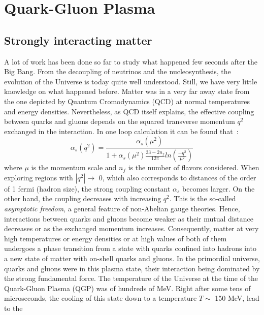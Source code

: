 
\chapter{Quark-Gluon Plasma} %

\label{Chapter1} %

\section{Strongly interacting matter}
A lot of work has been done so far to study what happened few seconds
after the Big Bang. From the decoupling of neutrinos 
and the nucleosynthesis, the evolution of the Universe is today quite well
understood. Still, we have very little knowledge on what happened before.
Matter was in a very far away state from the one depicted by Quantum Cromodynamics (QCD) at normal temperatures and energy densities. 
Nevertheless, as QCD itself explains, the effective coupling between quarks and gluons depends on the squared transverse momentum $q^2$ exchanged in the interaction. In one loop calculation it can be found that~\cite{Wilson:1970ag}:
\begin{equation}
\alpha_s(q^2)=\frac{\alpha_s (\mu^2)}{1+\alpha_s (\mu^2) \frac{33-2n_f}{12\pi}ln(\frac{-q^2}{\mu^2})}
\end{equation}
where $\mu$ is the momentum scale and $n_f$ is the number of flavors considered. When exploring regions with $|q^2|\rightarrow$ 0, which also corresponds to distances of the order of 1 fermi (hadron size), the strong coupling constant $\alpha_s$ becomes larger. On the other hand, the coupling decreases with increasing $q^2$. This is the so-called {\it asymptotic freedom}, a general feature of non-Abelian gauge theories. Hence, interactions between quarks and gluons become weaker as their mutual distance decreases or as the exchanged momentum increases.
Consequently, matter at very high temperatures or energy densities or at high values of both of them undergoes a phase transition from a state with quarks confined into hadrons into a new state of matter with on-shell quarks and gluons. 
In the primordial universe, quarks and gluons were in this plasma state, their interaction being dominated by the strong fundamental force.
The temperature of the Universe at the time of the Quark-Gluon Plasma (QGP) 
was of hundreds of MeV.
Right after some tens of microseconds, the cooling of this state down to 
a temperature $T \sim$ 150 MeV, lead to the 
